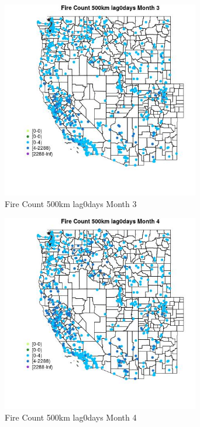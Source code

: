 \begin{figure} 
\centering  
\includegraphics[width=0.77\textwidth]{Code_Outputs/Report_ML_input_PM25_Step4_part_e_de_duplicated_aves_compiled_2019-05-21wNAs_MapObsMo3Fire_Count_500km_lag0days.jpg} 
\caption{\label{fig:Report_ML_input_PM25_Step4_part_e_de_duplicated_aves_compiled_2019-05-21wNAsMapObsMo3Fire_Count_500km_lag0days}Fire Count 500km lag0days Month 3} 
\end{figure} 
 

\begin{figure} 
\centering  
\includegraphics[width=0.77\textwidth]{Code_Outputs/Report_ML_input_PM25_Step4_part_e_de_duplicated_aves_compiled_2019-05-21wNAs_MapObsMo4Fire_Count_500km_lag0days.jpg} 
\caption{\label{fig:Report_ML_input_PM25_Step4_part_e_de_duplicated_aves_compiled_2019-05-21wNAsMapObsMo4Fire_Count_500km_lag0days}Fire Count 500km lag0days Month 4} 
\end{figure} 
 

